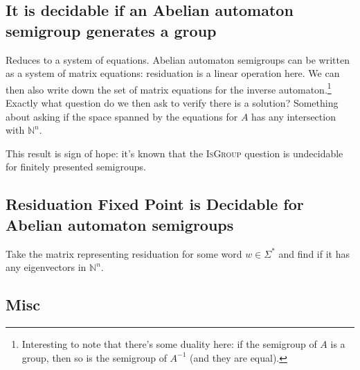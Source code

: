 \documentclass[10pt,a4paper]{article} %
\theoremstyle{pleasant}
\begin{document}


    \subsection{It is decidable if an Abelian automaton semigroup generates a group} 

    Reduces to a system of equations. Abelian automaton semigroups can be written as a system of matrix equations: residuation is a linear operation here. We can then also write down the set of matrix equations for the inverse automaton.\footnote{Interesting to note that there's some duality here: if the semigroup of $A$ is a group, then so is the semigroup of $A^{-1}$ (and they are equal).}
    Exactly what question do we then ask to verify there is a solution? Something about asking if the space spanned by the equations for $A$ has any intersection with $\mathbb{N}^n$.

    This result is sign of hope: it's known that the \textsc{IsGroup} question is undecidable for finitely presented semigroups\cite{Cain09:dec_prob}.

    \subsection{Residuation Fixed Point is Decidable for Abelian automaton semigroups} 

    Take the matrix representing residuation for some word $w \in \Sigma^*$ and find if it has any eigenvectors in $\mathbb{N}^n$.

    \subsection{Misc}
\end{document}
